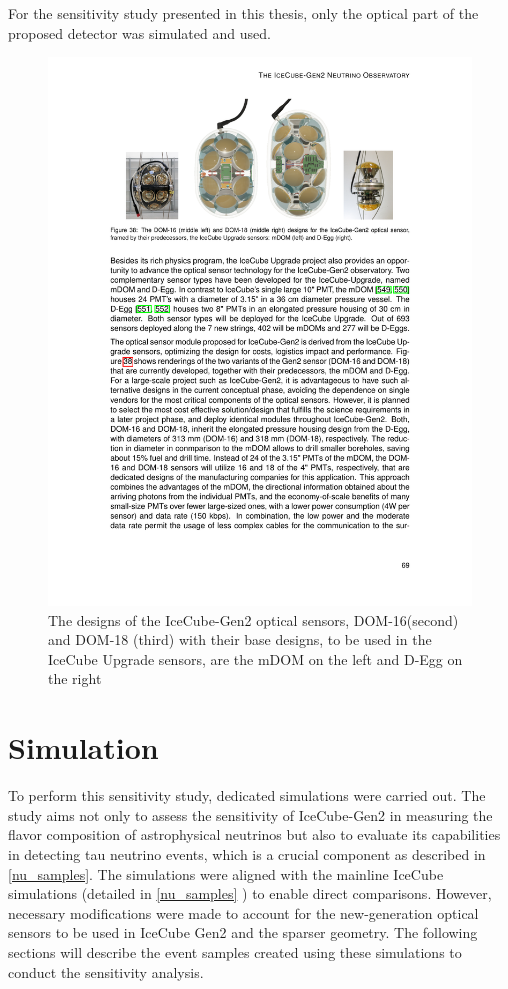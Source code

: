 For the sensitivity study presented in this thesis, only the optical part of the proposed detector was simulated and used. 

\begin{figure}
	\includegraphics[scale=2.2]{./figures/gen2/Gen2_DOMs.pdf}
	\caption{The designs of the IceCube-Gen2 optical sensors, DOM-16(second) and DOM-18 (third) with their base designs, to be used in the IceCube Upgrade sensors, are the mDOM on the left and D-Egg on the right \cite{Gen2_TDR}}
\end{figure}

\section{Simulation}
\label{sec:gen2-sim}
To perform this sensitivity study, dedicated simulations were carried out. The study aims not only to assess the sensitivity of IceCube-Gen2 in measuring the flavor composition of astrophysical neutrinos but also to evaluate its capabilities in detecting tau neutrino events, which is a crucial component as described in \ref{nu_samples}. The simulations were aligned with the mainline IceCube simulations (detailed in \ref{nu_samples} ) to enable direct comparisons. However, necessary modifications were made to account for the new-generation optical sensors to be used in IceCube Gen2 and the sparser geometry. The following sections will describe the event samples created using these simulations to conduct the sensitivity analysis.

